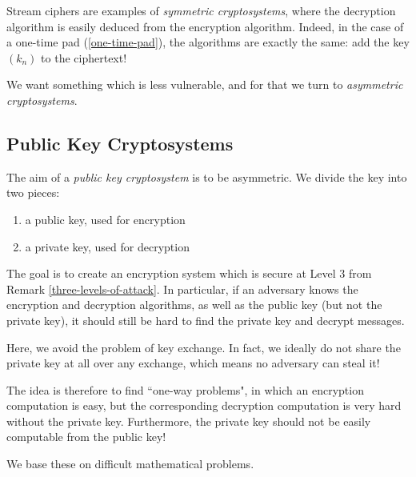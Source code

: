 \documentclass{article}
\begin{document}
Stream ciphers are examples of \textit{symmetric cryptosystems}, where the decryption algorithm is easily deduced from the encryption algorithm. Indeed, in the case of a one-time pad (\ref{one-time-pad}), the algorithms are exactly the same: add the key $(k_n)$ to the ciphertext!

We want something which is less vulnerable, and for that we turn to \textit{asymmetric cryptosystems}.


\subsection{Public Key Cryptosystems}
\label{section-cryptography-public-key}

The aim of a \textit{public key cryptosystem} is to be asymmetric. We divide the key into two pieces:
\begin{enumerate}
    \item a public key, used for encryption
    \item a private key, used for decryption
\end{enumerate}
The goal is to create an encryption system which is secure at Level 3 from Remark \ref{three-levels-of-attack}. In particular, if an adversary knows the encryption and decryption algorithms, as well as the public key (but not the private key), it should still be hard to find the private key and decrypt messages.

\begin{note}
	Here, we avoid the problem of key exchange. In fact, we ideally do not share the private key at all over any exchange, which means no adversary can steal it!
\end{note}

The idea is therefore to find ``one-way problems", in which an encryption computation is easy, but the corresponding decryption computation is very hard without the private key. Furthermore, the private key should not be easily computable from the public key!

We base these on difficult mathematical  problems.
\end{document}
